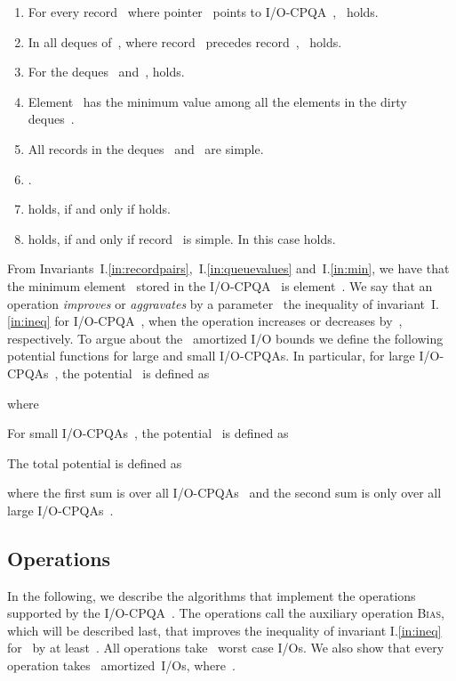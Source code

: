 \documentclass[]{article}
\newcommand{\iref}[1]{I.\ref{#1}}
\begin{document}
\begin{enumerate}[{I}.1)]
  \item \label{in:records} For every record~ where pointer~ points
    to I/O-CPQA~,~ holds.
  
  \item \label{in:recordpairs} In all deques of~, where
    record~ precedes record~,~ holds.

  \item \label{in:queuevalues} For the deques~ and~,
     holds.

  \item \label{in:min} Element~ has the minimum value
    among all the elements in the dirty deques~.

  \item \label{in:simple} All records in the deques~ and~ are
    simple.

  \item \label{in:ineq} .

  \item \label{in:small}  holds, if and only if 
    holds.

  \item \label{in:smalltail}  holds, if and only if
    record~ is simple. In this case  holds.
\end{enumerate}
From Invariants~\iref{in:recordpairs},~\iref{in:queuevalues} and~\iref{in:min},
we have that the minimum element~ stored in the I/O-CPQA~ is
element~. We say that an operation \textit{improves} or
\textit{aggravates} by a parameter~ the inequality of
invariant~\iref{in:ineq} for I/O-CPQA~, when the operation increases or
decreases  by~,
respectively. To argue about the~ amortized I/O bounds we define the
following potential functions for large and small I/O-CPQAs. In particular, for
large I/O-CPQAs~, the potential~ is defined as

where 

For small I/O-CPQAs~, the potential~ is defined as

The total potential  is defined as

where the first sum is over all I/O-CPQAs~ and the second sum is only over
all large I/O-CPQAs~.

\subsection{Operations}


In the following, we describe the algorithms that implement the operations
supported by the I/O-CPQA~. The operations call the auxiliary operation
\textsc{Bias}, which will be described last, that improves the inequality
of invariant \iref{in:ineq} for~ by at least~. All operations
take~ worst case I/Os.  We also show that every operation
takes~ amortized~I/Os, where~.
\end{document}
